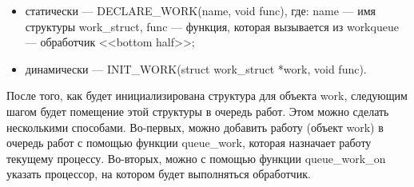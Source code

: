 \begin{itemize}
    \item статически --- DECLARE\_WORK(name, void func), где: name --- имя структуры work\_struct, func --- функция, которая вызывается из workqueue --- обработчик <<bottom half>>;
    \item динамически --- INIT\_WORK(struct work\_struct *work, void func).
\end{itemize}

После того, как будет инициализирована структура для объекта work, следующим шагом будет помещение этой структуры в очередь работ.
Этом можно сделать несколькими способами. 
Во-первых, можно добавить работу (объект work) в очередь работ с помощью функции queue\_work,
которая назначает работу текущему процессу.
Во-вторых, можно с помощью функции queue\_work\_on указать процессор, на котором будет выполняться обработчик.



